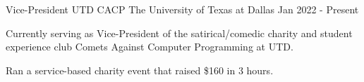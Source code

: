 
\begin{cventries}

\cventry
{Vice-President} %
{UTD CACP} %
{The University of Texas at Dallas} %
{Jan 2022 - Present} %
{
	\begin{cvitems}
	\item {Currently serving as Vice-President of the satirical/comedic
		charity and student experience club Comets Against Computer
		Programming at UTD.}
	\item {Ran a service-based charity event that raised \$160 in 3 hours.}
	\end{cvitems}
}

\end{cventries}

